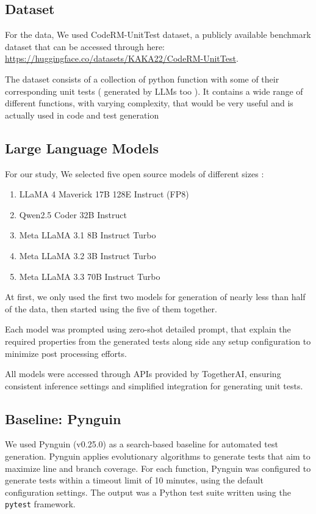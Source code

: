 \documentclass[12pt]{article}
\begin{document}
\subsection {Dataset}

For the data, We used CodeRM-UnitTest dataset, a publicly available benchmark dataset that can be accessed through here:  {\url{https://huggingface.co/datasets/KAKA22/CodeRM-UnitTest}}.

The dataset consists of a collection of python function with some of their corresponding unit tests ( generated by LLMs too ). It contains a wide range of different functions, with varying complexity, that would be very useful and is actually used in code and test generation 


\subsection {Large Language Models}

For our study, We selected five open source models of different sizes : 
\begin{enumerate}
    \item {LLaMA 4 Maverick 17B 128E Instruct (FP8)}
    \item {Qwen2.5 Coder 32B Instruct}
    \item {Meta LLaMA 3.1 8B Instruct Turbo}
    \item {Meta LLaMA 3.2 3B Instruct Turbo}
    \item {Meta LLaMA 3.3 70B Instruct Turbo}
\end{enumerate}
At first, we only used the first two models for generation of nearly less than half of the data, then started using the five of them together.

Each model was prompted using zero-shot detailed prompt, that explain the required properties from the generated tests along side any setup configuration to minimize post processing efforts.


All models were accessed through APIs provided by TogetherAI, ensuring consistent inference settings and simplified integration for generating unit tests.


\subsection {Baseline: Pynguin}
We used Pynguin (v0.25.0) as a search-based baseline for automated test generation. Pynguin applies evolutionary algorithms to generate tests that aim to maximize line and branch coverage. For each function, Pynguin was configured to generate tests within a timeout limit of 10 minutes, using the default configuration settings. The output was a Python test suite written using the \texttt{pytest} framework.
\end{document}
